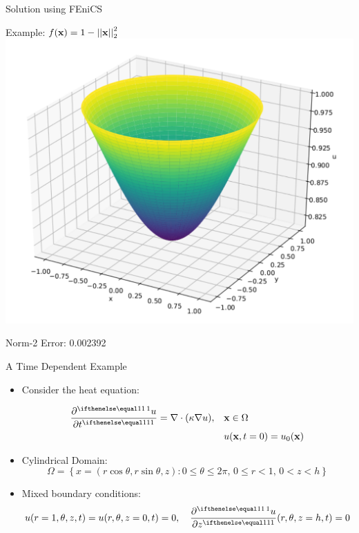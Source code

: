 \documentclass[serif]{beamer}
\begin{document}
\begin{frame}{Solution using FEniCS}

    Example: $f(\mathbf{x}) = 1 - \left|\left| \mathbf{x} \right|\right|^2_2$
    \centering
    \includegraphics[height=0.75\textheight]{figures/fenics-laplace-circle.pdf}
    
    Norm-2 Error: 0.002392
    
\end{frame}


\begin{frame}{A Time Dependent Example}
    \begin{itemize}
        \item Consider the heat equation:
        
        \begin{equation}
            \label{eq:heat-dirichlet-circle}
            \begin{split}
            \pder{u}{t} = \nabla \cdot (\kappa \nabla u), \quad & \vec x \in \Omega \\
            & u(\vec x, t=0) = u_0(\vec x)
            \end{split}
        \end{equation}
			\item Cylindrical Domain:
				\[
					\Omega = \left\{x = (r \cos\theta, r \sin \theta, z) : 0 \leq \theta \leq 2\pi, \, 0 \leq r < 1, \, 0 < z < h\right\}
				\] 
			\item Mixed boundary conditions:
        \[
					u(r=1, \theta, z, t) = u(r, \theta, z=0, t) = 0, \quad 
					\pder{u}{z}(r, \theta, z=h, t) = 0
        \] 
    \end{itemize}
\end{frame}
\end{document}
